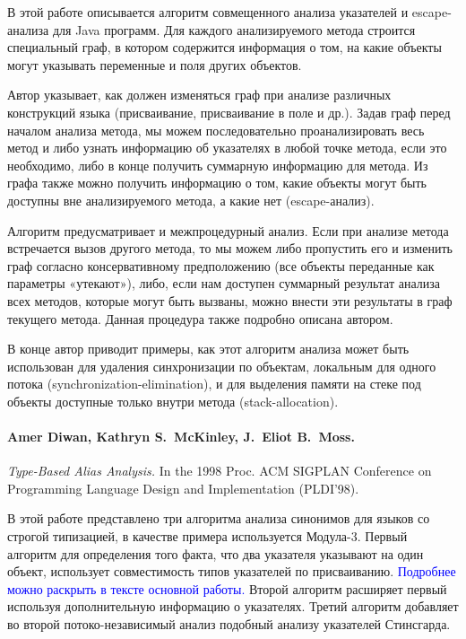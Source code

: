 \documentclass[12pt]{article}
\newcommand{\remark}[1]{\textcolor{blue}{#1}}
\newcommand{\eng}[1]{{\English#1}}
\begin{document}
      В этой работе описывается алгоритм совмещенного анализа указателей и
      escape-анализа для Java программ. Для каждого анализируемого
      метода строится специальный граф, в котором содержится информация о том,
      на какие объекты могут указывать переменные и поля других объектов.

      Автор указывает, как должен изменяться граф при анализе различных
      конструкций языка (присваивание, присваивание в поле и др.).
      Задав граф перед началом анализа метода, мы можем последовательно
      проанализировать весь метод и либо узнать информацию об указателях в
      любой точке метода, если это необходимо, либо в конце получить суммарную
      информацию для метода. Из графа также можно получить информацию о том,
      какие объекты могут быть доступны вне анализируемого метода, а какие нет
      (escape-анализ).

      Алгоритм предусматривает и межпроцедурный анализ. Если при анализе
      метода встречается вызов другого метода, то мы можем либо пропустить его
      и изменить граф согласно консервативному предположению (все объекты
      переданные как параметры «утекают»), либо, если нам доступен суммарный
      результат анализа всех методов, которые могут быть вызваны, можно внести
      эти результаты в граф текущего метода. Данная процедура также подробно
      описана автором.

      В конце автор приводит примеры, как этот алгоритм анализа может быть
      использован для удаления синхронизации по объектам, локальным для одного
      потока (\eng{synchronization-elimination}), и
      для выделения памяти на стеке под объекты доступные только внутри метода
      (\eng{stack-allocation}).

    \paragraph{Amer Diwan, Kathryn S.~McKinley, J.~Eliot B.~Moss.}
      \eng{
        \textit{Type-Based Alias Analysis.}
        In the 1998 Proc. ACM SIGPLAN Conference on Programming Language
        Design and Implementation (PLDI’98).
      }

      В этой работе представлено три алгоритма анализа синонимов для языков со
      строгой типизацией, в качестве примера используется Модула-3.
      Первый алгоритм для определения того факта, что два указателя указывают
      на один объект, использует совместимость типов указателей по
      присваиванию. \remark{Подробнее можно раскрыть в тексте основной
      работы.} Второй алгоритм расширяет первый используя дополнительную
      информацию о указателях. Третий алгоритм добавляет во второй
      потоко-независимый анализ подобный анализу указателей Стинсгарда.
\end{document}
